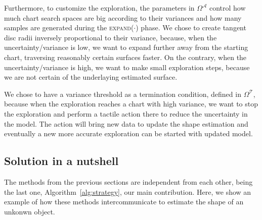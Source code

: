 Furthermore, to customize the exploration, the parameters in $\Omega^{\mathcal{A}}$ 
control how much chart search spaces are big according to their variances and how many
samples are generated during the \textsc{expand}($\cdot$) phase. 
We chose to create tangent disc radii inversely proportional to their variance,
because, when the uncertainty/variance is low, we want to expand further
away from the starting chart, traversing reasonably certain surfaces faster.
On the contrary, when the uncertainty/variance is high, we want to make small
exploration steps, because we are not certain of the underlaying estimated surface.

We chose to have a variance threshold as a termination condition, defined in $\Omega^{\mathcal{T}}$,
because when the exploration reaches a chart with high variance, we want to stop
the exploration and perform a tactile action there to reduce the uncertainty in the
model. 
The action will bring new data to update the shape estimation and eventually 
a new more accurate exploration can be started with updated model.

\subsection{Solution in a nutshell}
\label{sec:summary}

The methods from the previous sections are independent from each other, being the last one, Algorithm~\ref{alg:strategy}, our main contribution. Here, we show an example of how these methods intercommunicate to estimate the shape of an unkonwn object.

